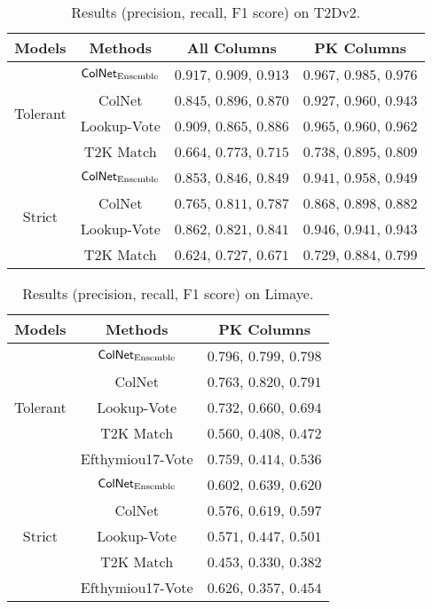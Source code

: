 \documentclass[letterpaper]{article}
\newcommand{\rv}[1]{{\color{black}#1}}
\newcommand{\ColNet}{\textsf{ColNet}\xspace}
\begin{document}
\begin{table}[h!]
\scriptsize{
\centering
\begin{tabular}[t]{c|c|c|c}
\hline
Models & Methods& All Columns & PK Columns    \\\hline 
\multirow{4}{*}{Tolerant}&$\text{\ColNet}_{\text{Ensemble}}$ & $0.917$, $0.909$, $0.913$ & $0.967$, $0.985$, $0.976$ \\
&\ColNet &$0.845$, $0.896$, $0.870$ & $0.927$, $0.960$, $0.943$ \\
&Lookup-Vote &$0.909$, $0.865$, $0.886$ & $0.965$, $0.960$, $0.962$ \\
&T2K Match & $0.664$, $0.773$, $0.715$ & $0.738$, $0.895$, $0.809$ \\\hline\hline
\multirow{4}{*}{Strict} &$\text{\ColNet}_{\text{Ensemble}}$ & $0.853$, $0.846$, $0.849$ & $0.941$, $0.958$, $0.949$ \\
&\ColNet & $0.765$, $0.811$, $0.787$  & $0.868$, $0.898$, $0.882$  \\
&Lookup-Vote & $0.862$, $0.821$, $0.841$ & $0.946$, $0.941$, $0.943$ \\
&T2K Match & $0.624$, $0.727$, $0.671$ & $0.729$, $0.884$, $0.799$ \\\hline
\end{tabular}
\caption{
\label{res:t2d}
\rv{Results (precision, recall, F1 score) on T2Dv2.}
}
}
\end{table}

\begin{table}[h!]
\scriptsize{
\centering
\begin{tabular}[t]{c|c|c}
\hline
Models & Methods& PK Columns   \\\hline 
\multirow{5}{*}{Tolerant}&$\text{\ColNet}_{\text{Ensemble}}$ &$0.796$, $0.799$, $0.798$   \\
&\ColNet & $0.763$, $0.820$, $0.791$ \\
&Lookup-Vote & $0.732$, $0.660$, $0.694$  \\
&T2K Match & $0.560$, $0.408$, $0.472$\\
&Efthymiou17-Vote & $0.759$, $0.414$, $0.536$  \\\hline\hline
\multirow{5}{*}{Strict}&$\text{\ColNet}_{\text{Ensemble}}$ &$0.602$, $0.639$, $0.620$   \\
&\ColNet & $0.576$, $0.619$, $0.597$  \\
&Lookup-Vote & $0.571$, $0.447$, $0.501$ \\
&T2K Match & $0.453$, $0.330$, $0.382$ \\
&Efthymiou17-Vote & $0.626$, $0.357$, $0.454$   \\\hline
\end{tabular}
\caption{
\label{res:limaye}
\rv{Results (precision, recall, F1 score) on Limaye.}
}
}
\end{table}
\end{document}
